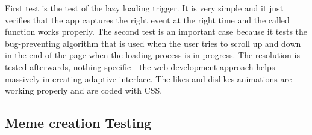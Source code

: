 \documentclass[12pt]{report}
\begin{document}
\begin{appendices}
First test is the test of the lazy loading trigger. It is very simple and it just verifies that the app captures
the right event at the right time and the called function works properly. The second test is an important case
because it tests the bug-preventing algorithm that is used when the user tries to scroll up and down in the end of
the page when the loading process is in progress. The resolution is tested afterwards, nothing specific - the 
web development approach helps massively in creating adaptive interface. The likes and dislikes animations are
working properly and are coded with CSS.

\clearpage

\subsection*{Meme creation Testing}
\label{appendix:meme_creation_testing}


\end{appendices}
\end{document}
